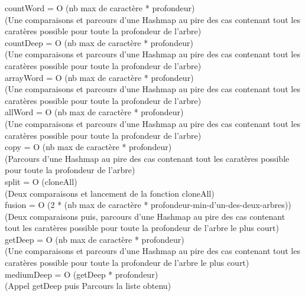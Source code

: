 \documentclass{article}
\begin{document}
countWord = O (nb max de caractère * profondeur)\\
(Une comparaisons et parcours d'une Hashmap au pire des cas contenant tout
les caratères possible pour toute la profondeur de l'arbre)\\

countDeep = O (nb max de caractère * profondeur)\\
(Une comparaisons et parcours d'une Hashmap au pire des cas contenant tout
les caratères possible pour toute la profondeur de l'arbre)\\

arrayWord = O (nb max de caractère * profondeur)\\
(Une comparaisons et parcours d'une Hashmap au pire des cas contenant tout
les caratères possible pour toute la profondeur de l'arbre)\\

allWord = O (nb max de caractère * profondeur)\\
(Une comparaisons et parcours d'une Hashmap au pire des cas contenant tout
les caratères possible pour toute la profondeur de l'arbre)\\

copy = O (nb max de caractère * profondeur)\\
(Parcours d'une Hashmap au pire des cas contenant tout les caratères
possible pour toute la profondeur de l'arbre)\\

split = O (cloneAll)\\
(Deux comparaisons et lancement de la fonction cloneAll)\\

fusion = O (2 * (nb max de caractère * profondeur-min-d'un-des-deux-arbres))
\\
(Deux comparaisons puis, parcours d'une Hashmap au pire des cas contenant
tout les caratères possible pour toute la profondeur de l'arbre le plus court)\\

getDeep = O (nb max de caractère * profondeur)\\
(Une comparaisons et parcours d'une Hashmap au pire des cas contenant tout
les caratères possible pour toute la profondeur de l'arbre le plus court)\\

mediumDeep = O (getDeep * profondeur)\\
(Appel getDeep puis Parcours la liste obtenu)\\
\end{document}
